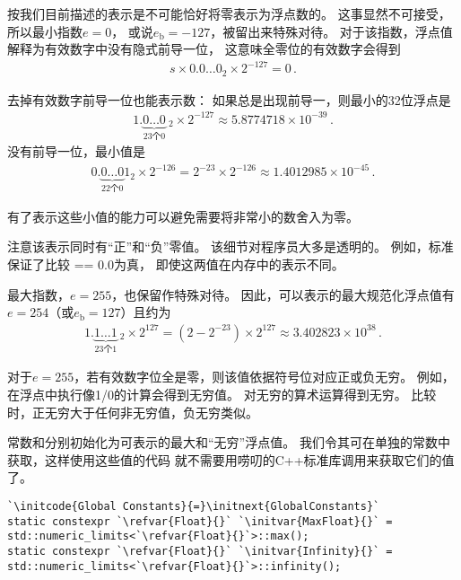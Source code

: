 按我们目前描述的表示是不可能恰好将零表示为浮点数的。
这事显然不可接受，所以最小指数$e=0$，
或说$e_{\mathrm{b}}=-127$，被留出来特殊对待。
对于该指数，浮点值解释为有效数字中没有隐式前导一位，
这意味全零位的有效数字会得到
\begin{align*}
    s\times0.0\ldots0_2\times2^{-127}=0\, .
\end{align*}

去掉有效数字前导一位也能表示数：
如果总是出现前导一，则最小的32位浮点是
\begin{align*}
    1.{\underbrace{0\ldots0}_{\text{23个0}}}\ _2\times2^{-127}\approx5.8774718\times10^{-39}\, .
\end{align*}
没有前导一位，最小值是
\begin{align*}
    0.\underbrace{0\ldots0}_{\text{22个0}}1_2\times2^{-126}=2^{-23}\times2^{-126}\approx1.4012985\times10^{-45}\, .
\end{align*}

有了表示这些小值的能力可以避免需要将非常小的数舍入为零。

注意该表示同时有“正”和“负”零值。
该细节对程序员大多是透明的。
例如，标准保证了比较{ == 0.0}为真，
即使这两值在内存中的表示不同。

最大指数，$e=255$，也保留作特殊对待。
因此，可以表示的最大规范化浮点值有$e=254$（或$e_{\mathrm{b}}=127$）且约为
\begin{align*}
    1.{\underbrace{1\ldots1}_{\text{23个1}}}\ _2\times2^{127}=(2-2^{-23})\times2^{127}\approx3.402823\times10^{38}\, .
\end{align*}

对于$e=255$，若有效数字位全是零，则该值依据符号位对应正或负无穷。
例如，在浮点中执行像1/0的计算会得到无穷值。
对无穷的算术运算得到无穷。
比较时，正无穷大于任何非无穷值，负无穷类似。

常数和分别初始化为可表示的最大和“无穷”浮点值。
我们令其可在单独的常数中获取，这样使用这些值的代码
就不需要用唠叨的C++标准库调用来获取它们的值了。
\begin{lstlisting}
`\initcode{Global Constants}{=}\initnext{GlobalConstants}`
static constexpr `\refvar{Float}{}` `\initvar{MaxFloat}{}` = std::numeric_limits<`\refvar{Float}{}`>::max();
static constexpr `\refvar{Float}{}` `\initvar{Infinity}{}` = std::numeric_limits<`\refvar{Float}{}`>::infinity();
\end{lstlisting}

